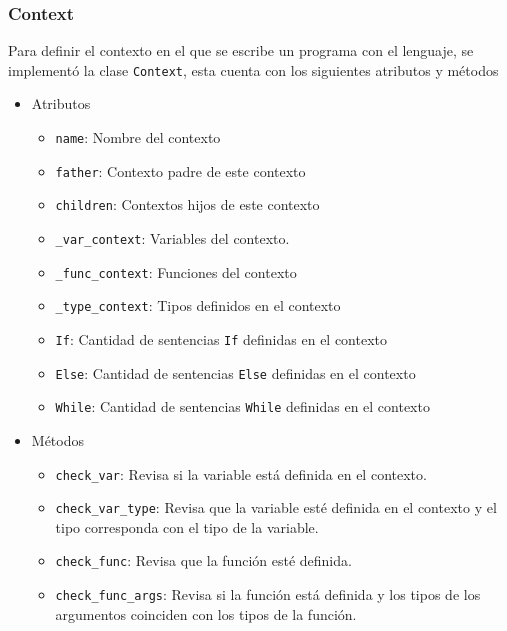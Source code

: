 \subsubsection{Context}
Para definir el contexto en el que se escribe un programa con el lenguaje, se implement\'o la clase \verb|Context|, esta cuenta con los siguientes atributos y m\'etodos 
\begin{itemize}
\item Atributos
\begin{itemize}
\item \verb|name|: Nombre del contexto 

\item \verb|father|: Contexto padre de este contexto

\item \verb|children|: Contextos hijos de este contexto

\item \verb|_var_context|: Variables del contexto. 

\item \verb|_func_context|: Funciones del contexto

\item \verb|_type_context|: Tipos definidos en el contexto

\item \verb|If|: Cantidad de sentencias \verb|If| definidas en el contexto

\item \verb|Else|: Cantidad de sentencias \verb|Else| definidas en el contexto

\item \verb|While|: Cantidad de sentencias \verb|While| definidas en el contexto
\end{itemize}

\item M\'etodos
\begin{itemize}
\item \verb|check_var|: Revisa si la variable est\'a definida en el contexto.

	\item \verb|check_var_type|: Revisa que la variable est\'e definida en el contexto y el tipo corresponda con el tipo de la variable.
	
	\item \verb|check_func|: Revisa que la funci\'on est\'e definida.
	
	\item \verb|check_func_args|: Revisa si la funci\'on est\'a definida y los tipos de los argumentos coinciden con los tipos de la funci\'on.
	

\end{itemize}
\end{itemize}
